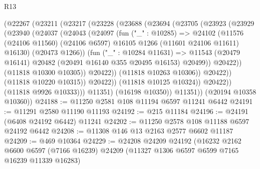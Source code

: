 \begin{lexlean}{R13}
\begin{coremodule}
                      (@22267
                        (@23211
                          (@23217
                            (@23228
                              (@23688
                                (@23694
                                  (@23705
                                    (@23923
                                      (@23929
                                        (@23940
                                          (@24037
                                            (@24043
                                              (@24097
                                                (fun ("_" : @10285) =>
                                                @24102
                                                  (@11576
                                                    (@24106 @11560)
                                                    (@24106 @6597)
                                                    @16105
                                                    @1266
                                                    (@11601 @24106 @11611)
                                                    @16130)
                                                  (@20473 @1266))
                                                (fun ("_" : @10284 @11631) =>
                                                @11543
                                                  (@20479 @16141)
                                                  @20482
                                                  (@20491 @16140 @355 @20495 @16153)
                                                  @20499))
                                              @20422))
                                          (@11818 @10300 @10305))
                                        @20422))
                                    (@11818 @10263 @10306))
                                  @20422))
                              (@11818 @10220 @10315))
                            @20422))
                        (@11818 @10125 @10324))
                      @20422))
                  (@11818 @9926 @10333)))
              @11351)
            (@16198 @10350))
          @11351))
      (@20194 @10358 @10360))
@24188 := @11250 @2581 @108 @11194 @6597 @11241 @6442
@24191 := @11291 @2580 @11190 @11193
@24192 := @215 @11184
@24196 := @24191 (@6408 @24192 @6442) @11241
@24202 := @11250 @2578 @108 @11188 @6597 @24192 @6442
@24208 := @11308 @146 @13 @2163 @2577 @6602 @11187
@24209 := @469 @10364
@24229 := @24208
    @24209
    @24192
    (@16232
      @2162
      @6600
      @6597
      (@7166 @16239)
      @24209
      (@11327 @1306 @6597 @6599 @7165 @16239 @11339 @16283)

\end{coremodule}
\end{lexlean}
